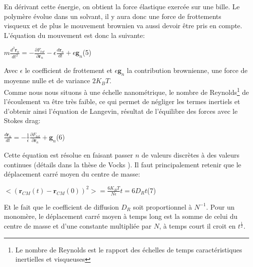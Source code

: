 \documentclass[a4paper,11pt]{article}
\begin{document}
En dérivant cette énergie, on obtient la force élastique exercée sur une bille. Le polymère évolue dans un solvant, il y aura donc une force de frottements visqueux et de plus le mouvement brownien va aussi devoir être pris en compte. L'équation du mouvement est donc la suivante:

\begin{center}

$m \frac{d^2 \textbf{r}_n}{dt^2} = -\frac{\partial F_{tot}}{\partial \textbf{r}_n} -\epsilon \frac{d \textbf{r}_n}{dt} +\epsilon \textbf{g}_n$\flushright(5)

\end{center}

Avec $\epsilon$ le coefficient de frottement et $\epsilon\textbf{g}_n$ la contribution brownienne, une force de moyenne nulle et de variance $ 2 K_B T$.\\



Comme nous nous situons à une échelle nanométrique, le nombre de Reynolds\footnote{Le nombre de Reynolds est le rapport des échelles de temps caractéristiques inertielles et visqueuses} de l'écoulement va être très faible, ce qui permet de négliger les termes inertiels et d'obtenir ainsi l'équation de Langevin, résultat de l'équilibre des forces avec le Stokes drag:

\begin{center}

$\frac{d \textbf{r}_n}{dt} = -\frac{1}{\epsilon}\frac{\partial F_{tot}}{\partial \textbf{r}_n} +\textbf{g}_n$\flushright(6)

\end{center}

Cette équation est résolue en faisant passer $n$ de valeurs discrètes à des valeurs continues (détails dans la thèse de Vocks \cite{these}). Il faut principalement retenir que le déplacement carré moyen du centre de masse:

\begin{center}

$<(\textbf{r}_{CM}(t)-\textbf{r}_{CM}(0))^2>=\frac{6 K_B T}{N \epsilon} t = 6 D_R t$\flushright(7)

\end{center}

Et le fait que le coefficient de diffusion $D_R$ soit proportionnel à $N^{-1}$. Pour un monomère, le déplacement carré moyen à temps long est la somme de celui du centre de masse et d'une constante multipliée par $N$, à temps court il croit en $t^{\frac{1}{2}}$.\\
\end{document}
